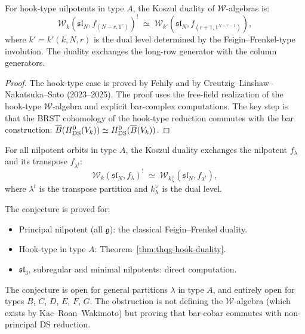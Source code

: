 \begin{theorem}
\label{thm:thqg-hook-duality}
For hook-type nilpotents in type $A$, the Koszul duality of
$\mathcal{W}$-algebras is:
\begin{equation}%
\mathcal{W}_k(\mathfrak{sl}_N, f_{(N-r,1^r)})^!
\;\simeq\;
\mathcal{W}_{k'}\!(\mathfrak{sl}_N, f_{(r+1, 1^{N-r-1})}),
\end{equation}
where $k' = k'(k, N, r)$ is the dual level determined by the
Feigin--Frenkel-type involution. The duality exchanges the long-row
generator with the column generators.
\end{theorem}

\begin{proof}
The hook-type case is proved by Fehily and by
Creutzig--Linshaw--Nakatsuka--Sato (2023--2025). The proof uses
the free-field realization of the hook-type $\mathcal{W}$-algebra and
explicit bar-complex computations. The key step is that the BRST
cohomology of the hook-type reduction commutes with the bar
construction: $\overline{B}(H^0_{\mathrm{DS}}(V_k)) \simeq
H^0_{\mathrm{DS}}(\overline{B}(V_k))$.
\end{proof}


\begin{conjecture}
For all nilpotent orbits in type $A$, the Koszul duality exchanges
the nilpotent $f_\lambda$ and its transpose $f_{\lambda^t}$:
\begin{equation}%
\mathcal{W}_k(\mathfrak{sl}_N, f_\lambda)^!
\;\simeq\;
\mathcal{W}_{k^\vee_\lambda}(\mathfrak{sl}_N, f_{\lambda^t}),
\end{equation}
where $\lambda^t$ is the transpose partition and $k^\vee_\lambda$
is the dual level.
\end{conjecture}

\begin{remark}
The conjecture is proved for:
\begin{itemize}
\item Principal nilpotent (all $\mathfrak{g}$): the classical
 Feigin--Frenkel duality.
\item Hook-type in type $A$: Theorem~\ref{thm:thqg-hook-duality}.
\item $\mathfrak{sl}_3$, subregular and minimal nilpotents:
 direct computation.
\end{itemize}
The conjecture is open for general partitions $\lambda$ in type $A$,
and entirely open for types $B$, $C$, $D$, $E$, $F$, $G$. The
obstruction is not defining the $\mathcal{W}$-algebra (which exists
by Kac--Roan--Wakimoto) but proving that bar-cobar commutes with
non-principal DS reduction.
\end{remark}


